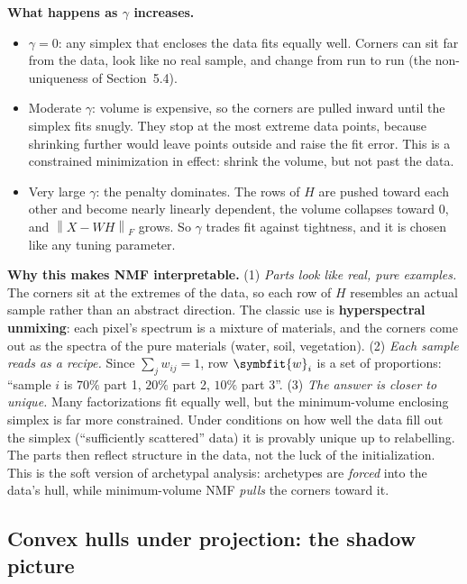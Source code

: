 \documentclass[11pt]{article}
\newcommand{\bm}[1]{\symbfit{#1}}
\newcommand{\Fro}[1]{\left\lVert #1\right\rVert_F}
\begin{document}
\textbf{What happens as $\gamma$ increases.}
\begin{itemize}[nosep]
\item $\gamma=0$: any simplex that encloses the data fits equally well. Corners can sit far from the data,
look like no real sample, and change from run to run (the non-uniqueness of Section~5.4).
\item Moderate $\gamma$: volume is expensive, so the corners are pulled inward until the simplex fits
snugly. They stop at the most extreme data points, because shrinking further would leave points outside
and raise the fit error. This is a constrained minimization in effect: shrink the volume, but not past the data.
\item Very large $\gamma$: the penalty dominates. The rows of $H$ are pushed toward each other and become nearly
linearly dependent, the volume collapses toward $0$, and $\Fro{X-WH}$ grows. So $\gamma$ trades fit
against tightness, and it is chosen like any tuning parameter.
\end{itemize}

\begin{intuition}
\textbf{Why this makes NMF interpretable.}
(1) \emph{Parts look like real, pure examples.} The corners sit at the extremes of the data, so each row of
$H$ resembles an actual sample rather than an abstract direction. The classic use is
\textbf{hyperspectral unmixing}: each pixel's spectrum is a mixture of materials, and the corners come out
as the spectra of the pure materials (water, soil, vegetation).
(2) \emph{Each sample reads as a recipe.} Since $\sum_jw_{ij}=1$, row $\bm w_i$ is a set of proportions:
``sample $i$ is $70\%$ part 1, $20\%$ part 2, $10\%$ part 3''.
(3) \emph{The answer is closer to unique.} Many factorizations fit equally well, but the
minimum-volume enclosing simplex is far more constrained. Under conditions on how well the data
fill out the simplex (``sufficiently scattered'' data) it is provably unique up to relabelling. The parts
then reflect structure in the data, not the luck of the initialization.
This is the soft version of archetypal analysis: archetypes are \emph{forced} into the data's hull, while
minimum-volume NMF \emph{pulls} the corners toward it.
\end{intuition}

\subsection{Convex hulls under projection: the shadow picture}
\end{document}
